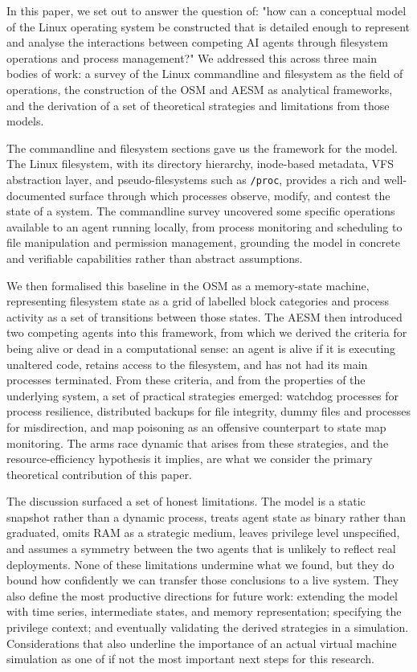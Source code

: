 In this paper, we set out to answer the question of: "how can a conceptual model of the Linux operating system be constructed that is detailed enough to represent and analyse the interactions between competing AI agents through filesystem operations and process management?" We addressed this across three main bodies of work: a survey of the Linux commandline and filesystem as the field of operations, the construction of the OSM and AESM as analytical frameworks, and the derivation of a set of theoretical strategies and limitations from those models.

The commandline and filesystem sections gave us the framework for the model. The Linux filesystem, with its directory hierarchy, inode-based metadata, VFS abstraction layer, and pseudo-filesystems such as \texttt{/proc}, provides a rich and well-documented surface through which processes observe, modify, and contest the state of a system. The commandline survey uncovered some specific operations available to an agent running locally, from process monitoring and scheduling to file manipulation and permission management, grounding the model in concrete and verifiable capabilities rather than abstract assumptions.

We then formalised this baseline in the OSM as a memory-state machine, representing filesystem state as a grid of labelled block categories and process activity as a set of transitions between those states. The AESM then introduced two competing agents into this framework, from which we derived the criteria for being alive or dead in a computational sense: an agent is alive if it is executing unaltered code, retains access to the filesystem, and has not had its main processes terminated. From these criteria, and from the properties of the underlying system, a set of practical strategies emerged: watchdog processes for process resilience, distributed backups for file integrity, dummy files and processes for misdirection, and map poisoning as an offensive counterpart to state map monitoring. The arms race dynamic that arises from these strategies, and the resource-efficiency hypothesis it implies, are what we consider the primary theoretical contribution of this paper.

The discussion surfaced a set of honest limitations. The model is a static snapshot rather than a dynamic process, treats agent state as binary rather than graduated, omits RAM as a strategic medium, leaves privilege level unspecified, and assumes a symmetry between the two agents that is unlikely to reflect real deployments. None of these limitations undermine what we found, but they do bound how confidently we can transfer those conclusions to a live system. They also define the most productive directions for future work: extending the model with time series, intermediate states, and memory representation; specifying the privilege context; and eventually validating the derived strategies in a simulation. Considerations that also underline the importance of an actual virtual machine simulation as one of if not the most important next steps for this research.

